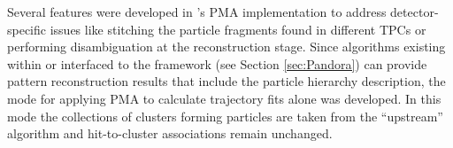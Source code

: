 Several features were developed in 's PMA implementation to address detector-specific issues like stitching the particle fragments found in different TPCs or %
performing disambiguation at the \threed reconstruction stage. Since algorithms existing within or interfaced to the  framework (see Section \ref{sec:Pandora}) can provide pattern reconstruction results that include the particle hierarchy description, the mode for applying PMA to calculate %
trajectory fits alone was developed. In this mode the collections of clusters forming particles are taken from the ``upstream'' algorithm and  hit-to-cluster associations remain unchanged. %




